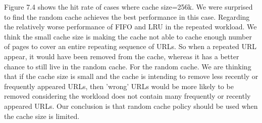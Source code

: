 \documentclass[paper=a4, fontsize=11pt]{scrartcl} %
\numberwithin{equation}{section} %
\numberwithin{figure}{section} %
\numberwithin{table}{section} %
\begin{document}
Figure 7.4 shows the hit rate of cases where cache size=256k. We were surprised to find the random cache achieves the best performance in this case. Regarding the relatively worse performance of FIFO and LRU in the repeated workload. We think the small cache size is making the cache not able to cache enough number of pages to cover an entire repeating sequence of URLs. So when a repeated URL appear, it would have been removed from the cache, whereas it has a better chance to still live in the random cache. For the random cache. We are thinking that if the cache size is small and the cache is intending to remove less recently or frequently appeared URLs, then 'wrong' URLs would be more likely to be removed considering the workload does not contain many frequently or recently appeared URLs. Our conclusion is that random cache policy should be used when the cache size is limited.    
\end{document}
